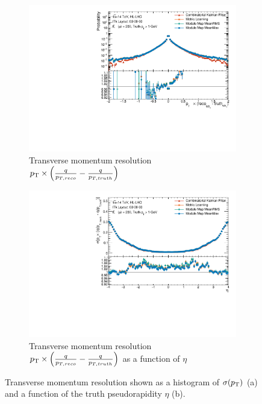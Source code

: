 \begin{figure}[h!]
\centering
\begin{subfigure}[b]{0.65\textwidth}
    \centering
    \includegraphics[width=\textwidth]{figures/ckf-gnn/Matched/Resolutions/Primary/res_ptqopt.pdf}
    \caption{Transverse momentum resolution $p_{\text{T}}  \times \left ( \frac{q}{p_{T, reco}} - \frac{q}{p_{T, truth}} \right)$}
    \label{subfig:res-pt-hist}
\end{subfigure}
\begin{subfigure}[b]{0.65\textwidth}
    \centering
    \includegraphics[width=\textwidth]{figures/ckf-gnn/Matched/Resolutions/Primary/resolution_vs_eta_ptqopt.pdf}
    \caption{Transverse momentum resolution $p_{\text{T}} \times \left ( \frac{q}{p_{T, reco}} - \frac{q}{p_{T, truth}} \right)$ as a function of $\eta$}
    \label{subfig:res-pt-eta}
\end{subfigure}
    \caption{Transverse momentum resolution shown as a histogram of $\sigma(p_{\text{T}})$ (a) and a function of the truth pseudorapidity $\eta$ (b). }
    \label{fig:res-pt}
\end{figure}

